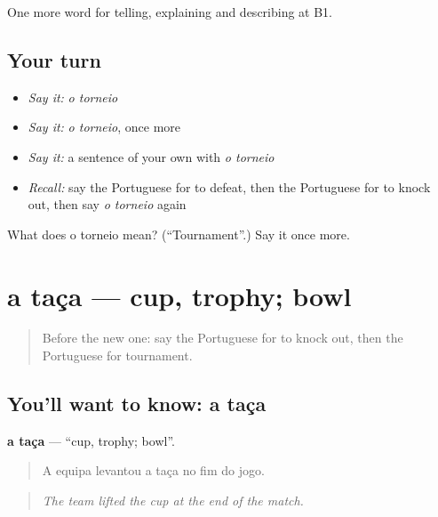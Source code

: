 \begin{grammarlens}[title={What you've built}]
One more word for telling, explaining and describing at B1.
\end{grammarlens}

\subsection*{Your turn}
\begin{itemize}
\raggedright
  \item \emph{Say it:} \emph{o torneio}
  \item \emph{Say it:} \emph{o torneio}, once more
  \item \emph{Say it:} a sentence of your own with \emph{o torneio}
  \item \emph{Recall:} say the Portuguese for to defeat, then the Portuguese for to knock out, then say \emph{o torneio} again
\end{itemize}

\begin{tcolorbox}[breakable,colback=teal!4,colframe=teal!35!black,title={Before you move on}]
What does o torneio mean? (\textquotedblleft{}Tournament\textquotedblright{}.) Say it once more.
\end{tcolorbox}
\section[a taça]{a taça — cup, trophy; bowl}

\label{lesson:PT-C511-taca}



\begin{quote}
Before the new one: say the Portuguese for to knock out, then the Portuguese for tournament.
\end{quote}

\subsection*{You'll want to know: a taça}
\textbf{a taça} — \textquotedblleft{}cup, trophy; bowl\textquotedblright{}.

\begin{quote}
A equipa levantou a taça no fim do jogo.
\end{quote}

\begin{quote}
\emph{The team lifted the cup at the end of the match.}
\end{quote}

